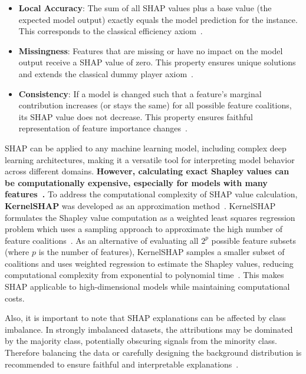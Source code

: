 \begin{itemize}
    \item \textbf{Local Accuracy}: The sum of all SHAP values plus a base value (the expected model output) exactly equals the model prediction for the instance. This corresponds to the classical efficiency axiom~\cite{lundberg2017shap}.
    \item \textbf{Missingness}: Features that are missing or have no impact on the model output receive a SHAP value of zero. This property ensures unique solutions and extends the classical dummy player axiom~\cite{lundberg2017shap}.
    \item \textbf{Consistency}: If a model is changed such that a feature's marginal contribution increases (or stays the same) for all possible feature coalitions, its SHAP value does not decrease. This property ensures faithful representation of feature importance changes~\cite{lundberg2017shap}.
\end{itemize}

SHAP can be applied to any machine learning model, including complex deep learning architectures, making it a versatile tool for interpreting model behavior across different domains. \textbf{However, calculating exact Shapley values can be computationally expensive, especially for models with many features~\cite{rozemberczki2022shapley,aas2021explaining}.}  To address the computational complexity of SHAP value calculation, \textbf{KernelSHAP} was developed as an approximation method~\cite{lundberg2017shap}. KernelSHAP formulates the Shapley value computation as a weighted least squares regression problem which uses a sampling approach to approximate the high number of feature coalitions~\cite{covert2021}. As an alternative of evaluating all $2^p$ possible feature subsets (where $p$ is the number of features), KernelSHAP samples a smaller subset of coalitions and uses weighted regression to estimate the Shapley values, reducing computational complexity from exponential to polynomial time~\cite{rozemberczki2022shapley}. This makes SHAP applicable to high-dimensional models while maintaining computational costs.

Also, it is important to note that SHAP explanations can be affected by class imbalance. In strongly imbalanced datasets, the attributions may be dominated by the majority class, potentially obscuring signals from the minority class. Therefore balancing the data or carefully designing the background distribution is recommended to ensure faithful and interpretable explanations~\cite{liu2022balancedbackgroundexplanationdata,chen2024interpretable}.

